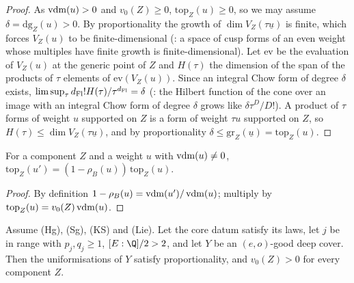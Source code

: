 \begin{proof}
As $\operatorname{vdm}(u)>0$ and $v_0(Z)\ge0$, $\mathrm{top}_Z(u)\ge0$, so we may assume $\delta=\mathrm{dg}_Z(u)>0$. By
proportionality the growth of $\dim V_Z(\tau\underline u)$ is finite, which forces $V_Z(u)$ to be finite-dimensional
(: a space of cusp forms of an even weight whose multiples
have finite growth is finite-dimensional). Let $\mathrm{ev}$ be the evaluation of $V_Z(u)$ at the generic point of $Z$ and
$H(\tau)$ the dimension of the span of the products of $\tau$ elements of $\mathrm{ev}(V_Z(u))$. Since an integral Chow
form of degree $\delta$ exists, $\limsup_\tau d_{\mathrm{Fl}}!H(\tau)/\tau^{d_{\mathrm{Fl}}}=\delta$
(: the Hilbert function of the cone over an image with
an integral Chow form of degree $\delta$ grows like $\delta\tau^D/D!$). A product of $\tau$ forms of weight $u$ supported
on $Z$ is a form of weight $\tau u$ supported on $Z$, so $H(\tau)\le\dim V_Z(\tau\underline u)$, and by proportionality
$\delta\le\mathrm{gr}_Z(\underline u)=\mathrm{top}_Z(u)$.
\end{proof}

\begin{lemma}\label{pf:lift2:delprime}
For a component $Z$ and a weight $u$ with $\operatorname{vdm}(u)\ne0$, $\mathrm{top}_Z(u')=(1-\rho_B(u))\,\mathrm{top}_Z(u)$.
\end{lemma}

\begin{proof}
By definition $1-\rho_B(u)=\operatorname{vdm}(u')/\operatorname{vdm}(u)$; multiply by $\mathrm{top}_Z(u)=v_0(Z)\operatorname{vdm}(u)$.
\end{proof}

\begin{proposition}\label{pf:lift2:proport}
Assume \textup{(Hg)}, \textup{(Sg)}, \textup{(KS)} and \textup{(Lie)}. Let the core datum satisfy its laws, let $j$
be in range with $p_j,q_j\ge1$, $[E:\Q]/2>2$, and let $Y$ be an $(e,o)$-good deep cover. Then the uniformisations of $Y$
satisfy proportionality, and $v_0(Z)>0$ for every component $Z$.
\end{proposition}

